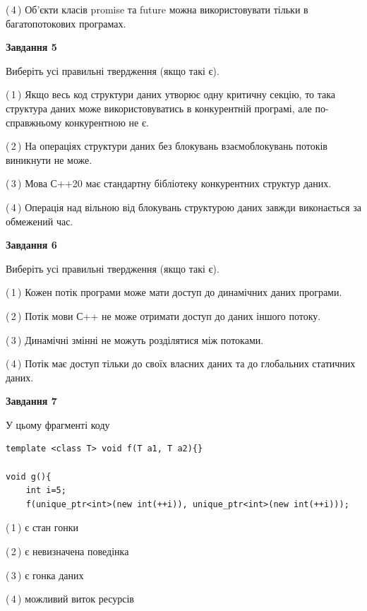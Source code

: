 \documentclass[12pt, ukrainian]{article}
\begin{document}
\begin {large}
{(\,4\,) Об’єкти класів promise та future можна використовувати тільки в багатопотокових програмах.%


\begin{center}
\textbf{Завдання 5}
\end{center}

Виберіть усі правильні твердження (якщо такі є).\par
\vspace{2mm}

(\,1\,) Якщо весь код структури даних утворює одну критичну секцію, то така структура даних може використовуватись в конкурентній програмі, але по-справжньо\-му конкурентною не є.%

(\,2\,) На операціях структури даних без блокувань взаємоблокувань потоків виникнути не може.%

(\,3\,) Мова С++20 має стандартну бібліотеку конкурентних структур даних.%

(\,4\,) Операція над вільною від блокувань структурою даних завжди виконається за обмежений час.%
\newpage


\begin{center}
\textbf{Завдання 6}
\end{center}

Виберіть усі правильні твердження (якщо такі є).\par
\vspace{2mm}

(\,1\,) Кожен потік програми може мати доступ до динамічних даних програми.%

(\,2\,) Потік мови С++ не може отримати доступ до даних іншого потоку.%

(\,3\,) Динамічні змінні не можуть розділятися між потоками.%

(\,4\,) Потік має доступ тільки до своїх власних даних та до глобальних статичних даних.%


\begin{center}
\textbf{Завдання 7}
\end{center}

У цьому фрагменті коду
\begin{verbatim}
template <class T> void f(T a1, T a2){}

void g(){
    int i=5;
    f(unique_ptr<int>(new int(++i)), unique_ptr<int>(new int(++i)));
\end{verbatim}

(\,1\,) є стан гонки%

(\,2\,) є невизначена поведінка%

(\,3\,) є гонка даних%

(\,4\,) можливий виток ресурсів%

}
\end {large}

\vspace{4mm}
\newpage
\end{document}
